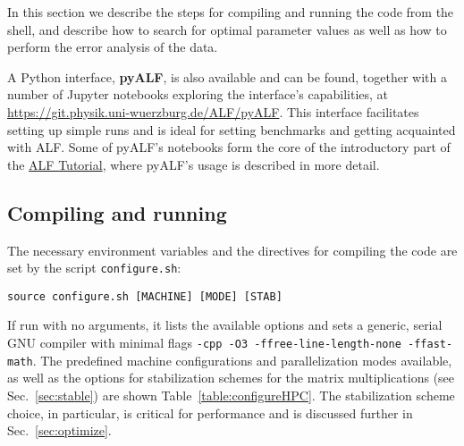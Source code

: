 


In this section we describe the steps for compiling and running the code from the shell, and describe how to search for optimal parameter values as well as how to perform the error analysis of the data.

A Python interface, \textbf{pyALF}, is also available and can be found, together with a number of Jupyter notebooks exploring the interface's capabilities, at \url{https://git.physik.uni-wuerzburg.de/ALF/pyALF}. This interface facilitates setting up simple runs and is ideal for setting benchmarks and getting acquainted with ALF. Some of pyALF's notebooks form the core of the introductory part of the \href{https://git.physik.uni-wuerzburg.de/ALF/ALF_Tutorial}{ALF Tutorial}, where pyALF's usage is described in more detail.

\subsection{Compiling and running}
\label{sec:compilation}

The necessary environment variables and the directives for compiling the code are set by the script \texttt{configure.sh}:
\begin{lstlisting}[style=bash]
source configure.sh [MACHINE] [MODE] [STAB]
\end{lstlisting}
If run with no arguments, it lists the available options and sets a generic, serial GNU compiler with minimal flags \texttt{-cpp -O3 -ffree-line-length-none -ffast-math}. The predefined machine configurations and parallelization modes available, as well as the options for stabilization schemes for the matrix multiplications (see Sec.~\ref{sec:stable}) are shown Table~\ref{table:configureHPC}. The stabilization scheme choice, in particular, is critical for performance and is discussed further in Sec.~\ref{sec:optimize}.

